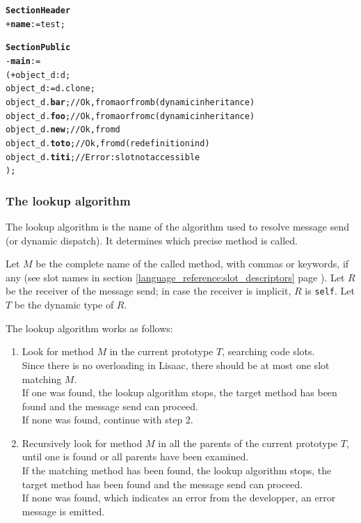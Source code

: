 \documentclass[11pt]{mybook}
\begin{document}
\begin{alltt}
{\bf{}Section Header}
  + {\bf{}name} := {\sc{}test};

{\bf{}Section Public}
  - {\bf{}main} :=
  ( + object_d:{\sc{}d};
    object_d := {\sc{}d}.clone;
    object_d.{\bf{}bar};   // Ok, from {\sc{}a} or from {\sc{}b} (dynamic inheritance)
    object_d.{\bf{}foo};   // Ok, from {\sc{}a} or from {\sc{}c} (dynamic inheritance)
    object_d.{\bf{}new};   // Ok, from {\sc{}d}
    object_d.{\bf{}toto};  // Ok, from {\sc{}d} (redefinition in {\sc{}d})
    object_d.{\bf{}titi};  // Error: slot not accessible     
  );
\end{alltt}

\subsubsection{The lookup algorithm}
\label{language_reference:section_identifiers:inherit_section:lookup}
%

The lookup algorithm is the name of the algorithm used to resolve
message send (or dynamic dispatch).
It determines which precise method is called.

Let $M$ be the complete name of the called method, with commas or
keywords, if any (see slot names in
section \ref{language_reference:slot_descriptors} page
\pageref{language_reference:slot_descriptors}).
Let $R$ be the receiver of the message send; in case the receiver is
implicit, $R$ is {\tt self}.
Let $T$ be the dynamic type of $R$.

The lookup algorithm works as follows: 
\begin{enumerate}
\item{Look for method $M$ in the current prototype $T$, searching
      code slots.\\
      Since there is no overloading in Lisaac, there should be at
      most one slot matching $M$.\\
      If one was found, the lookup algorithm stops, the target method
      has been found and the message send can proceed.\\
      If none was found, continue with step 2.
}
\item{Recursively look for method $M$ in all the parents of the current
      prototype $T$, until one is found or all parents have been
      examined.\\
      If the matching method has been found, the lookup algorithm
      stops, the target method has been found and the message send can
      proceed.\\  
      If none was found, which indicates an error from the developper,
      an error message is emitted.
}
\end{enumerate}
\end{document}
